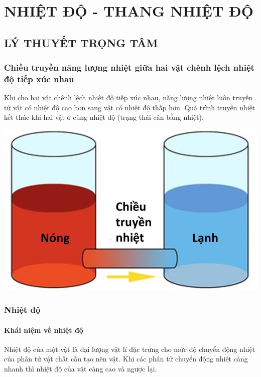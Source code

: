 \section{NHIỆT ĐỘ - THANG NHIỆT ĐỘ}
\subsection{LÝ THUYẾT TRỌNG TÂM}
\subsubsection{Chiều truyền năng lượng nhiệt giữa hai vật chênh lệch nhiệt độ tiếp xúc nhau}
\begin{boxdn}
	Khi cho hai vật chênh lệch nhiệt độ tiếp xúc nhau, năng lượng nhiệt luôn truyền từ vật có nhiệt độ cao hơn sang vật có nhiệt độ thấp hơn. Quá trình truyền nhiệt kết thúc khi hai vật ở cùng nhiệt độ (trạng thái cân bằng nhiệt).
\end{boxdn}
\begin{center}
	\includegraphics[width=0.3\linewidth]{figs/VN12-Y24-PH-SYL-002-1}
\end{center}
\subsubsection{Nhiệt độ}
\paragraph{Khái niệm về nhiệt độ}
\begin{boxdn}
	Nhiệt độ của một vật là đại lượng vật lí đặc trưng cho mức độ chuyển động nhiệt của phân tử vật chất cấu tạo nên vật. Khi các phân tử chuyển động nhiệt càng nhanh thì nhiệt độ của vật càng cao và ngược lại.
\end{boxdn}
